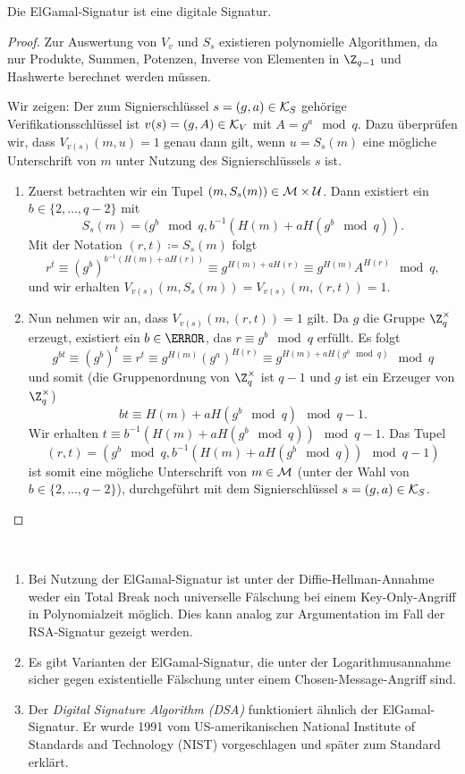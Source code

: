 \begin{lemma}
 Die ElGamal-Signatur ist eine digitale Signatur.
\end{lemma}
\begin{proof} 
 Zur Auswertung von $V_v$ und $S_s$ existieren polynomielle Algorithmen, da nur Produkte, Summen, Potenzen, Inverse von Elementen in $\Z_{q-1}$ und Hashwerte berechnet werden müssen. 
 
 Wir zeigen: Der zum Signierschlüssel $s = (g, a) \in \mathcal K_S$ gehörige Verifikationsschlüssel ist $v(s) = (g, A) \in \mathcal K_V$ mit $A = g^a \mod q$. Dazu überprüfen wir, dass $V_{v(s)}(m, u) = 1$ genau dann gilt, wenn $u = S_s(m)$ eine mögliche Unterschrift von $m$ unter Nutzung des Signierschlüssels $s$ ist.
 \begin{enumerate}
 \item Zuerst betrachten wir ein Tupel $(m, S_s(m)) \in \mathcal M \times \mathcal U$. Dann existiert ein $b \in \{2, \dots, q-2\}$ mit 
 \[S_s(m) = (g^b \mod q, b^{-1}(H(m) + aH(g^b \mod q)).\]
 Mit der Notation $(r, t) \coloneq S_s(m)$ folgt
 \[r^t \equiv (g^b)^{b^{-1}(H(m) + aH(r))} \equiv g^{H(m) + aH(r)} \equiv g^{H(m)}A^{H(r)} \mod q,\]
 und wir erhalten $V_{v(s)}(m, S_s(m)) = V_{v(s)}(m, (r, t))= 1$. 
 
 \item Nun nehmen wir an, dass $V_{v(s)}(m, (r, t)) = 1$ gilt. Da $g$ die Gruppe $\Z_q^{\times}$ erzeugt, existiert ein $b \in \N$, das $r \equiv g^b \mod q$ erfüllt. Es folgt
 \[g^{bt} \equiv (g^b)^t \equiv r^t \equiv g^{H(m)}(g^a)^{H(r)} \equiv g^{H(m)+ a H(g^b \mod q)} \mod q\]
 und somit (die Gruppenordnung von $\Z_q^{\times}$ ist $q-1$ und $g$ ist ein Erzeuger von $\Z_q^{\times}$)
 \[bt \equiv H(m) + aH(g^b \mod q) \mod q-1.\]
 Wir erhalten $t \equiv b^{-1}(H(m) + aH(g^b \mod q)) \mod q-1$. Das Tupel 
 \[(r, t) = (g^b \mod q, b^{-1}(H(m) + aH(g^b \mod q)) \mod q-1)\]
 ist somit eine mögliche Unterschrift von $m \in \mathcal M$ (unter der Wahl von $b \in \{2, \dotsc, q -2\}$), durchgeführt mit dem Signierschlüssel $s = (g, a) \in \mathcal K_S$.
 \end{enumerate}
\end{proof}

\begin{remark}{\ }
 \begin{enumerate}
  \item Bei Nutzung der ElGamal-Signatur ist unter der Diffie-Hellman-Annahme weder ein Total Break noch universelle Fälschung bei einem Key-Only-Angriff in Polynomialzeit möglich. Dies kann analog zur Argumentation im Fall der RSA-Signatur gezeigt werden.
  \item Es gibt Varianten der ElGamal-Signatur, die unter der Logarithmusannahme sicher gegen existentielle Fälschung unter einem Chosen-Message-Angriff sind.
  \item Der \emph{Digital Signature Algorithm (DSA)} funktioniert ähnlich der ElGamal-Signatur. Er wurde 1991 vom US-amerikanischen National Institute of Standards and Technology (NIST) vorgeschlagen und später zum Standard erklärt.
 \end{enumerate}
\end{remark}

